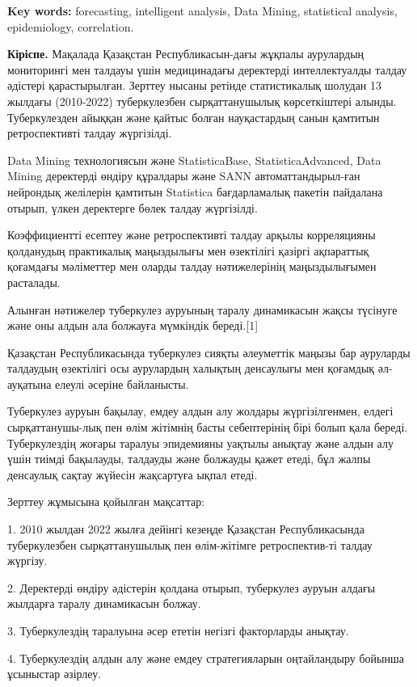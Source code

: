 {\bfseries Key words:} forecasting, intelligent analysis, Data Mining,
statistical analysis, epidemiology, correlation.
\begin{multicols}{2}

{\bfseries Кіріспе.} Мақалада Қазақстан Республикасын-дағы жұқпалы
аурулардың мониторингі мен талдауы үшін медицинадағы деректерді
интеллектуалды талдау әдістері қарастырылған. Зерттеу нысаны ретінде
статистикалық шолудан 13 жылдағы (2010-2022) туберкулезбен
сырқаттанушылық көрсеткіштері алынды. Туберкулезден айыққан және қайтыс
болған науқастардың санын қамтитын ретроспективті талдау жүргізілді.

Data Mining технологиясын және StatisticaBase, StatisticaAdvanced, Data
Mining деректерді өндіру құралдары және SANN автоматтандырыл-ған
нейрондық желілерін қамтитын Statistica бағдарламалық пакетін пайдалана
отырып, үлкен деректерге бөлек талдау жүргізілді.

Коэффициентті есептеу және ретроспективті талдау арқылы корреляцияны
қолданудың практикалық маңыздылығы мен өзектілігі қазіргі ақпараттық
қоғамдағы мәліметтер мен оларды талдау нәтижелерінің маңыздылығымен
расталады.

Алынған нәтижелер туберкулез ауруының таралу динамикасын жақсы түсінуге
және оны алдын ала болжауға мүмкіндік береді.{[}1{]}

Қазақстан Республикасында туберкулез сияқты әлеуметтік маңызы бар
ауруларды талдаудың өзектілігі осы аурулардың халықтың денсаулығы мен
қоғамдық әл-ауқатына елеулі әсеріне байланысты.

Туберкулез ауруын бақылау, емдеу алдын алу жолдары жүргізілгенмен,
елдегі сырқаттанушы-лық пен өлім жітімнің басты себептерінің бірі болып
қала береді. Туберкулездің жоғары таралуы эпидемияны уақтылы анықтау
және алдын алу үшін тиімді бақылауды, талдауды және болжауды қажет
етеді, бұл жалпы денсаулық сақтау жүйесін жақсартуға ықпал етеді.

Зерттеу жұмысына қойылған мақсаттар:

1. 2010 жылдан 2022 жылға дейінгі кезеңде Қазақстан Республикасында
туберкулезбен сырқаттанушылық пен өлім-жітімге ретроспектив-ті талдау
жүргізу.

2. Деректерді өндіру әдістерін қолдана отырып, туберкулез ауруын алдағы
жылдарға таралу динамикасын болжау.

3. Туберкулездің таралуына әсер ететін негізгі факторларды анықтау.

4. Туберкулездің алдын алу және емдеу стратегияларын оңтайландыру
бойынша ұсыныстар әзірлеу.


\end{multicols}
